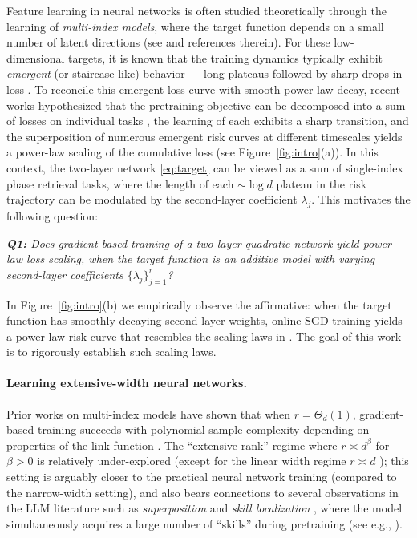 Feature learning in neural networks is often studied theoretically through the learning of \emph{multi-index models}, where the target function depends on a small number of latent directions (see \cite{bruna2025survey} and references therein). For these low-dimensional targets, it is known that the training dynamics typically exhibit \emph{emergent} (or staircase-like) behavior --- long plateaus followed by sharp drops in loss \cite{benarous2022high,abbe2023sgd}. 
To reconcile this emergent loss curve with smooth power-law decay, recent works hypothesized that the pretraining objective can be decomposed into a sum of losses on individual tasks \cite{michaud2024quantization,nam2024exactly}, the learning of each exhibits a sharp transition, and the superposition of numerous emergent risk curves at different timescales yields a power-law scaling of the cumulative loss (see Figure~\ref{fig:intro}(a)). In this context, the two-layer network \eqref{eq:target} can be viewed as a sum of single-index phase retrieval tasks, where the length of each $\sim\log d$ plateau in the risk trajectory can be modulated by the second-layer coefficient $\lambda_j$. This motivates the following question:

 
\begin{center}
\textit{\textbf{Q1:} Does gradient-based training of a two-layer quadratic network yield power-law loss scaling, when the target function is an additive model with varying second-layer coefficients $\{\lambda_j\}_{j=1}^{r}$?}
\end{center}
In Figure~\ref{fig:intro}(b) we empirically observe the affirmative: when the target function has smoothly decaying second-layer weights, online SGD training yields a power-law risk curve that resembles the scaling laws in \cite{kaplan2020scaling,hoffmann2022training}. 
The goal of this work is to rigorously establish such scaling laws. 


 
\paragraph{Learning extensive-width neural networks.} Prior works on multi-index models have shown that when $r =\Theta_d(1)$, gradient-based training succeeds with polynomial sample complexity depending on properties of the link function \cite{abbe2022merged,damian2022neural,bietti2022learning}. 
The ``extensive-rank'' regime where $r \asymp d^\beta$ for $\beta>0$ is relatively under-explored (except for the linear width regime $r \asymp d$ \cite{martin2023impact,maillard2024bayes}); this setting is arguably closer to the practical neural network training (compared to the narrow-width setting), and also bears connections to several observations in the LLM literature such as \textit{superposition} \cite{elhage2022toy} and \textit{skill localization} \cite{dai2021knowledge,wang2022finding,panigrahi2023task}, where the model simultaneously acquires a large number of ``skills'' during pretraining (see e.g., \cite{oko2024learning}). 

